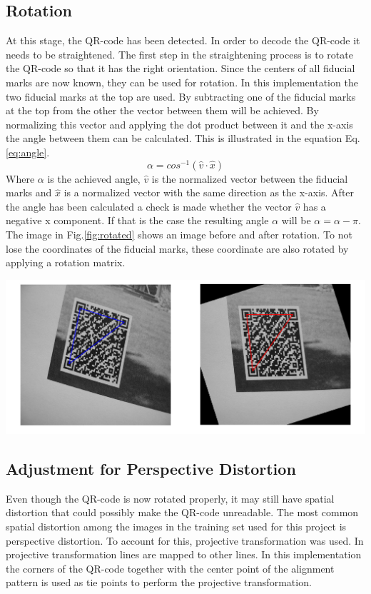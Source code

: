 \documentclass[12pt,a4paper]{article}
\newenvironment{Figure}
  {\par\medskip\noindent\minipage{\linewidth}}
  {\endminipage\par\medskip}
\begin{document}
\subsection{Rotation}
At this stage, the QR-code has been detected. In order to decode the QR-code it needs to be straightened. The first step in the straightening process is to rotate the QR-code so that it has the right orientation. Since the centers of all fiducial marks are now known, they can be used for rotation. In this implementation the two fiducial marks at the top are used. By subtracting one of the fiducial marks at the top from the other the vector between them will be achieved. By normalizing this vector and applying the dot product between it and the x-axis the angle between them can be calculated. This is illustrated in the equation Eq.\ref{eq:angle}.
\begin{equation}\label{eq:angle}
	\alpha = cos^{-1}(\hat{v} \cdot \hat{x})
\end{equation}
Where $\alpha$ is the achieved angle, $\hat{v}$ is the normalized vector between the fiducial marks and $\hat{x}$ is a normalized vector with the same direction as the x-axis. After the angle has been calculated a check is made whether the vector $\hat{v}$ has a negative x component. If that is the case the resulting angle $\alpha$ will be $\alpha=\alpha-\pi$. The image in Fig.\ref{fig:rotated} shows an image before and after rotation. 
To not lose the coordinates of the fiducial marks, these coordinate are also rotated by applying a rotation matrix. 
\begin{Figure}
  \centering
    \includegraphics[width=1\linewidth]{./img/rotated.png}
\end{Figure}

\subsection{Adjustment for Perspective Distortion}
Even though the QR-code is now rotated properly, it may still have spatial distortion that could possibly make the QR-code unreadable. The most common spatial distortion among the images in the training set used for this project is perspective distortion. To account for this, projective transformation was used. In projective transformation lines are mapped to other lines. In this implementation the corners of the QR-code together with the center point of the alignment pattern is used as tie points to perform the projective transformation.
\end{document}
